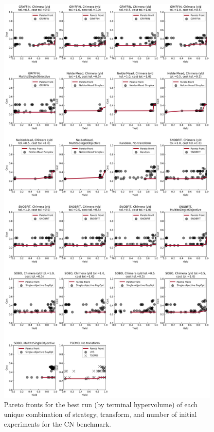 \begin{figure}[p]
    \centering
    \includegraphics[height=0.8\textheight]{gfx/Appendix/cn_pareto_fronts.png}
    \caption{Pareto fronts for the best run (by terminal hypervolume) of each unique combination of strategy, transform, and number of initial experiments for the CN benchmark.}
    \label{fig:cn_pareto_fronts}
\end{figure}

